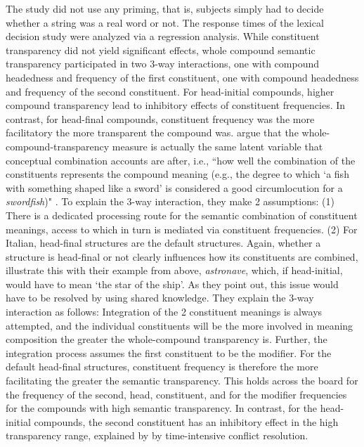 The  study did not use any priming, that is, subjects
simply had to decide whether a string was a real word or not. The
response times of the lexical decision study were analyzed via a
regression analysis. While constituent transparency did not yield
significant effects, whole compound semantic transparency participated
in two 3-way interactions, one with compound
headedness and frequency of the first constituent, one with compound
headedness and frequency of the second constituent. For head-initial compounds, higher compound transparency
lead to inhibitory effects of constituent frequencies. In contrast,
for head-final compounds, constituent frequency was the more
facilitatory the more transparent the compound
was. \citet{MarelliandLuzzatti:2012} argue that the
whole-compound-transparency measure is actually the same latent
variable that conceptual combination accounts are after, i.e., ``how
well the combination of the constituents represents the compound
meaning (e.g., the degree to which `a fish with something shaped like
a sword' is considered a good circumlocution for a \emph{swordfish})"
\citep[653]{MarelliandLuzzatti:2012}. To explain the 3-way
interaction, they make 2 assumptions: (1) There is a dedicated
processing route for the semantic combination of constituent meanings,
access to which in turn is mediated via constituent
frequencies. (2) For Italian, head-final structures are the default
structures. Again, whether a structure is head-final or not clearly
 influences how its constituents are combined,
\citet[653]{MarelliandLuzzatti:2012} illustrate this with their
example from above, \emph{astronave}, which, if head-initial, would
have to mean `the star of the ship'. As they point out, this issue
would have to be resolved by using shared knowledge. They explain the
3-way interaction as follows: Integration of the 2 constituent meanings is
always attempted, and the individual constituents will be the
more involved in meaning composition the greater the whole-compound
transparency is. Further, the integration process assumes the first
constituent to be the modifier. For the default head-final
structures, constituent frequency is therefore the more facilitating the greater
the semantic transparency. This holds across the board for the
frequency of the second, head, constituent, and for the modifier
frequencies for the compounds with high semantic transparency. In
contrast, for the head-initial compounds, the second constituent has
an inhibitory effect in the high transparency range, explained by
\citet{MarelliandLuzzatti:2012} %
by time-intensive conflict resolution.

